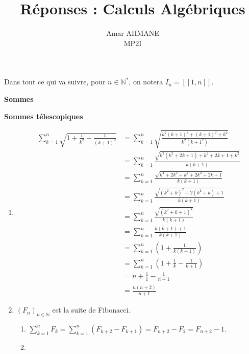 \documentclass[10pt]{article}
\title{\textbf{Réponses : Calculs Algébriques}}
\author{Amar AHMANE \\ MP2I}
\date{}
\newcommand{\sct}[1]{
	\begin{center}
		\Large\textbf{#1}
	\end{center}
}
\newcommand{\subsct}[1]{
	\begin{center}
		\large\textbf{#1}
	\end{center}
}
\def\N{\mathbb N}
\begin{document}
	\maketitle
	Dans tout ce qui va suivre, pour $n\in\N^*$, on notera $I_n=[\![1,n]\!]$.
	\sct{Sommes}
	\subsct{Sommes télescopiques}

	\vspace{2mm}

	\begin{enumerate}[start=1,label={\bfseries \arabic*}]
		\item 
		\begin{align*}
			\sum_{k=1}^n\sqrt{1+\frac1{k^2}+\frac1{(k+1)^2}} &= \sum_{k=1}^n\sqrt{\frac{k^2(k+1)^2+(k+1)^2+k^2}{k^2(k+1^2)}}\\
															 &= \sum_{k=1}^n \frac{\sqrt{k^2(k^2+2k+1)+k^2+2k+1+k^2}}{k(k+1)}\\
															 &= \sum_{k=1}^n\frac{\sqrt{k^4+2k^3+k^2+2k^2+2k+1}}{k(k+1)}\\
															 &= \sum_{k=1}^n\frac{\sqrt{(k^2+k)^2+2(k^2+k)+1}}{k(k+1)}\\
															 &= \sum_{k=1}^n\frac{\sqrt{(k^2+k+1)^2}}{k(k+1)}\\
															 &= \sum_{k=1}^n\frac{k(k+1)+1}{k(k+1)}\\
															 &= \sum_{k=1}^n\left(1+\frac{1}{k(k+1)}\right)\\
															 &= \sum_{k=1}^n\left(1+\frac1k-\frac1{k+1}\right)\\
															 &= n+\frac11-\frac1{n+1}\\
															 &=\frac{n(n+2)}{n+1}
		\end{align*}
		\item $(F_n)_{n\in\N}$ est la suite de Fibonacci.
		\begin{enumerate}[start=1, label={\bfseries \arabic*.}]
			\item \(\sum_{k=1}^nF_k=\sum_{k=1}^n(F_{k+2}-F_{k+1})=F_{n+2}-F_2=F_{n+2}-1\).
			\item 
		\end{enumerate}
	\end{enumerate}
\end{document}
